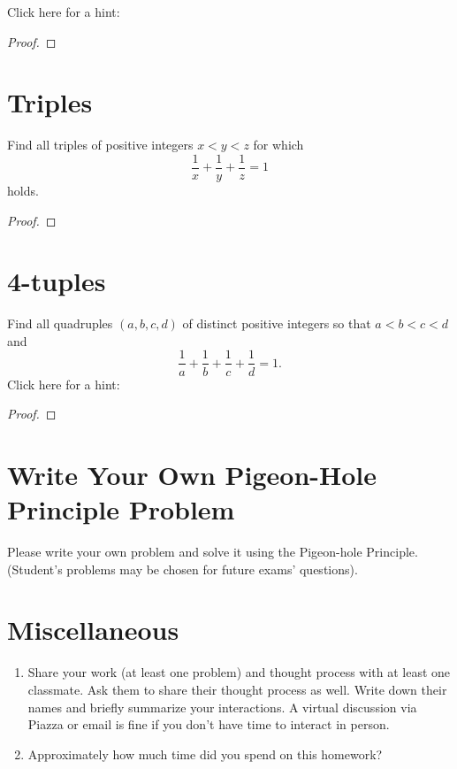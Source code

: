 \documentclass[12pt]{amsart}
\begin{document}
Click here for a hint: %
\begin{proof}
\end{proof}


\section{Triples}
Find all triples of positive integers $x < y < z$ for which
\[
\frac{1}{x} + \frac{1}{y} + \frac{1}{z} = 1
\]
holds. 
\begin{proof}
\end{proof}


\section{4-tuples}
Find all quadruples $(a,b,c,d)$ of distinct positive integers so that $a < b < c < d$ and 
\[
\frac{1}{a} + \frac{1}{b} + \frac{1}{c} + \frac{1}{d} = 1. 
\]
 Click here for a hint: %
\begin{proof}
\end{proof}

\section{Write Your Own Pigeon-Hole Principle Problem}\label{sec:write_your_own}
Please write your own problem and solve it using the Pigeon-hole Principle.
(Student's problems may be chosen for future exams' questions).

\section{Miscellaneous}
\begin{enumerate}
    \item Share your work (at least one problem) and thought process with at least one classmate. Ask them to share their thought process as well. Write down their names and briefly summarize your interactions. A virtual discussion via Piazza or email is fine if you don't have time to interact in person. 
    \item Approximately how much time did you spend on this homework?
\end{enumerate}
\end{document}

